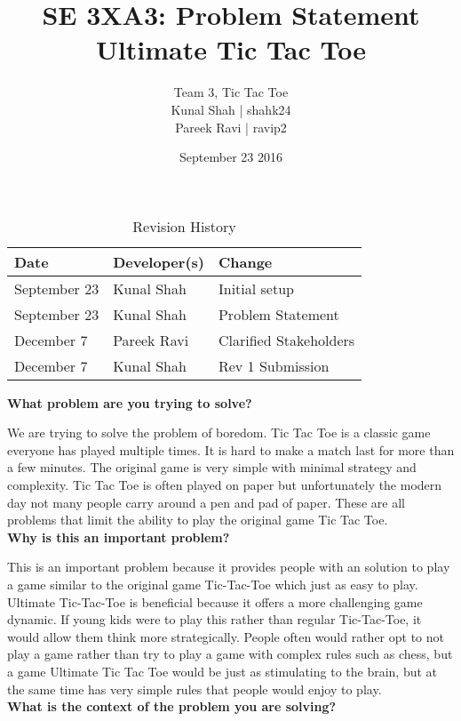 \documentclass{article}
\title{SE 3XA3: Problem Statement\\Ultimate Tic Tac Toe }
\author{Team 3, Tic Tac Toe
		\\ Kunal Shah | shahk24
		\\ Pareek Ravi | ravip2
}
\date{September 23 2016}
\begin{document}
\maketitle

\begin{table}[hp]
\caption{Revision History} \label{TblRevisionHistory}
\begin{tabularx}{\textwidth}{llX}
\toprule
\textbf{Date} & \textbf{Developer(s)} & \textbf{Change}\\
\midrule
September 23 & Kunal Shah & Initial setup\\
September 23 & Kunal Shah & Problem Statement \\
December 7 & Pareek Ravi & Clarified Stakeholders \\
December 7 & Kunal Shah & Rev 1 Submission \\
\bottomrule
\end{tabularx}
\end{table}

\newpage

\noindent \textbf{What problem are you trying to solve?}

We are trying to solve the problem of boredom. Tic Tac Toe is a classic game 
everyone has played multiple times. It is hard to make a match last for more 
than a few minutes. The original game is very simple with minimal strategy and 
complexity. Tic Tac Toe is often played on paper but unfortunately the modern 
day not many people carry around a pen and pad of paper. These are all 
problems that limit the ability to play the original game Tic Tac Toe.\\

\noindent \textbf {Why is this an important problem?}

This is an important problem because it provides people with an solution to 
play a game similar to the original game Tic-Tac-Toe which just as easy to 
play. Ultimate Tic-Tac-Toe is beneficial because it offers a more challenging 
game dynamic. If young kids were to play this rather than regular Tic-Tac-Toe, 
it would allow them think more strategically. People often would rather opt to 
not play a game rather than try to play a game with complex rules such as 
chess, but a game Ultimate Tic Tac Toe would be just as stimulating to the 
brain, but at the same time has very simple rules that people would enjoy to 
play.\\

\noindent \textbf {What is the context of the problem you are solving?}
\end{document}
